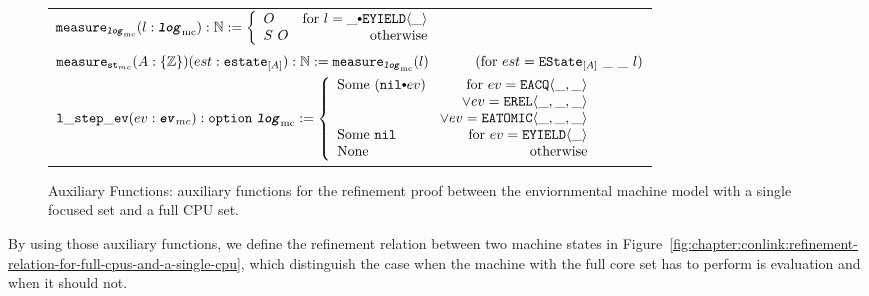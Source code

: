 \begin{figure}
\noindent{}
\begin{center}
\begin{tabular}{l}
$
   \mcmeasurekwd (l : \mclog)  : \nattype :=
     \left\{\begin{array}{lr}
        O & \text{for }  l = \listconsoppo{\yieldev{\_}}{\_} \\
        S \ O & \text{otherwise}\\
        \end{array} \right.$ \\
$ \mcstatemeasurekwd (A : \set{\ztype}) (est : \envstatekwd_{[A]}) : \nattype := \mcmeasurenoeq{l} \ \ \ \ \ \ \ \ \ \ (\text{for } est = \envstate{A}{\_}{\_}{l}) $\\
$ \localstepevkwd (ev : \mcevent) : \optiondef\ \mclog := 
     \left\{\begin{array}{lr}
        \mathrm{Some} \ (\listconsoppo{ev}{\nulllist}) & \text{for }  ev = \acqev{\_}{\_} \\
                                        & \vee  ev= \relev{\_}{\_}{\_} \\
                                        & \vee ev= \atomicev{\_}{\_}{\_} \\
        \mathrm{Some} \ \nulllist & \text{for }  ev = \yieldev{\_} \\
	   \mathrm{None} & \text{otherwise}\\
        \end{array} \right. $ \\
\end{tabular}        
\end{center}
%  
%
\caption{Auxiliary Functions:  auxiliary functions for the refinement proof between
the enviornmental machine model with a single focused set and a full CPU set.}
\label{fig:chapter:conlink:auxiliary-function-for-full-cpus-and-a-single-cpu}
\end{figure}


By using those auxiliary functions, we define the refinement relation between two machine states in Figure~\ref{fig:chapter:conlink:refinement-relation-for-full-cpus-and-a-single-cpu}, 
which distinguish the case when the machine with the full core set has to perform is evaluation and 
when it should not. 

